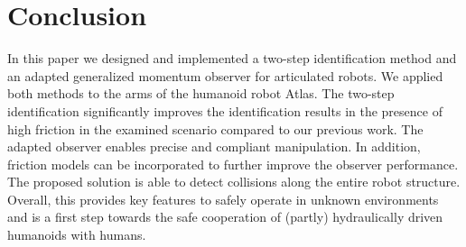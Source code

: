 \section{\large Conclusion}
\label{sec:conclusion}

In this paper we designed and implemented a two-step identification method and an adapted generalized momentum observer for articulated robots.
We applied both methods to the arms of the humanoid robot Atlas. 
The two-step identification significantly improves the identification results in the presence of high friction in the examined scenario compared to our previous work. 
The adapted observer enables precise and compliant manipulation.
In addition, friction models can be incorporated to further improve the observer performance. 
The proposed solution is able to detect collisions along the entire robot structure. 
Overall, this provides key features to safely operate in unknown environments and is a first step towards the safe cooperation of (partly) hydraulically driven humanoids with humans.






\renewcommand{\baselinestretch}{\BibBaselineStretch}

 
